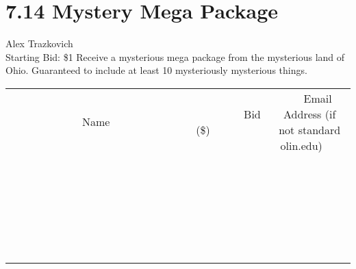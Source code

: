 \documentclass[11pt]{article}
\begin{document}
\section*{7.14 Mystery Mega Package}
Alex Trazkovich
\\
Starting Bid: \$1
\newline
Receive a mysterious mega package from the mysterious land of Ohio.  Guaranteed to include at least 10 mysteriously mysterious things.
\\[6ex]
\begin{tabular}{c c c}
~~~~~~~~~~~~~Name~~~~~~~~~~~~~ & ~~~~~~~~~Bid (\$)~~~~~~~~~  & ~~~Email Address (if not standard olin.edu)~~~\\
 & & \\
\hline
 & & \\
\hline
 & & \\
\hline
 & & \\
\hline
 & & \\
\hline
 & & \\
\hline
 & & \\
\hline
 & & \\
\hline
 & & \\
\hline
 & & \\
\hline
 & & \\
\hline
 & & \\
\hline
 & & \\
\hline
 & & \\
\hline
 & & \\
\hline
 & & \\
\hline
 & & \\
\hline
 & & \\
\hline
 & & \\
\hline
 & & \\
\hline
 & & \\
\hline
 & & \\
\hline
 & & \\
\hline
 & & \\
\hline
 & & \\
\hline
 & & \\
\hline
\end{tabular}
\newpage
\end{document}
